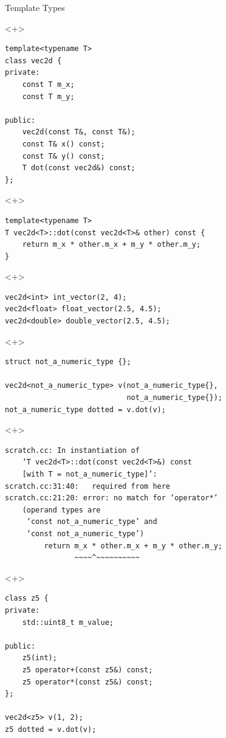 \documentclass[table]{beamer}
\begin{document}
\begin{frame}[fragile]{Template Types}
  \begin{onlyenv}<+>
    \begin{verbatim}
template<typename T>
class vec2d {
private:
    const T m_x;
    const T m_y;

public:
    vec2d(const T&, const T&);
    const T& x() const;
    const T& y() const;
    T dot(const vec2d&) const;
};
    \end{verbatim}
  \end{onlyenv}

  \begin{onlyenv}<+>
    \begin{verbatim}
template<typename T>
T vec2d<T>::dot(const vec2d<T>& other) const {
    return m_x * other.m_x + m_y * other.m_y;
}
    \end{verbatim}
  \end{onlyenv}

  \begin{onlyenv}<+>
    \begin{verbatim}
vec2d<int> int_vector(2, 4);
vec2d<float> float_vector(2.5, 4.5);
vec2d<double> double_vector(2.5, 4.5);
    \end{verbatim}
  \end{onlyenv}

  \begin{onlyenv}<+>
    \begin{verbatim}
struct not_a_numeric_type {};

vec2d<not_a_numeric_type> v(not_a_numeric_type{},
                            not_a_numeric_type{});
not_a_numeric_type dotted = v.dot(v);
    \end{verbatim}
  \end{onlyenv}

  \begin{onlyenv}<+>
    \begin{verbatim}
scratch.cc: In instantiation of
    ‘T vec2d<T>::dot(const vec2d<T>&) const
    [with T = not_a_numeric_type]’:
scratch.cc:31:40:   required from here
scratch.cc:21:20: error: no match for ‘operator*’
    (operand types are
     ‘const not_a_numeric_type’ and
     ‘const not_a_numeric_type’)
         return m_x * other.m_x + m_y * other.m_y;
                ~~~~^~~~~~~~~~~
    \end{verbatim}
  \end{onlyenv}
  
  \begin{onlyenv}<+>
    \begin{verbatim}
class z5 {
private:
    std::uint8_t m_value;

public:
    z5(int);
    z5 operator+(const z5&) const;
    z5 operator*(const z5&) const;
};

vec2d<z5> v(1, 2);
z5 dotted = v.dot(v);
    \end{verbatim}
  \end{onlyenv}
\end{frame}
\end{document}
